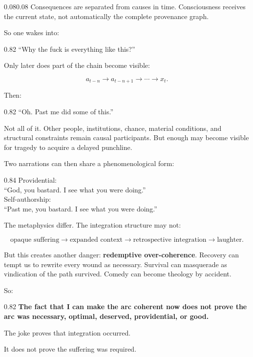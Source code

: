 \documentclass[10pt,letterpaper]{article}
\newenvironment{paperbody}
  {\begin{adjustwidth}{0.08\textwidth}{0.08\textwidth}\justifying}
  {\par\end{adjustwidth}}
\newenvironment{voicebox}
  {\Needspace{3.5\baselineskip}\par\vspace{0.22em}\begin{center}\begingroup
   \begin{lrbox}{\voiceboxsave}\begin{varwidth}{0.82\linewidth}
   \small\rmfamily\upshape\RaggedRight}
  {\end{varwidth}\end{lrbox}\fbox{\usebox{\voiceboxsave}}
   \endgroup\end{center}\vspace{0.22em}}
\newenvironment{dialoguebox}
  {\Needspace{5\baselineskip}\par\vspace{0.26em}\begin{center}\begingroup
   \begin{lrbox}{\dialogueboxsave}\begin{varwidth}{0.84\linewidth}
   \small\rmfamily\upshape\RaggedRight}
  {\end{varwidth}\end{lrbox}\fbox{\usebox{\dialogueboxsave}}
   \endgroup\end{center}\vspace{0.26em}}
\begin{document}
\begin{paperbody}
Consequences are separated from causes in time. Consciousness receives
the current state, not automatically the complete provenance graph.

So one wakes into:

\begin{voicebox}
``Why the fuck is everything like this?''
\end{voicebox}

Only later does part of the chain become visible:

\[
a_{t-n}\to a_{t-n+1}\to\cdots\to x_t.
\]

Then:

\begin{voicebox}
``Oh. Past me did some of this.''
\end{voicebox}

Not all of it. Other people, institutions, chance, material conditions,
and structural constraints remain causal participants. But enough may
become visible for tragedy to acquire a delayed punchline.

Two narrations can then share a phenomenological form:

\begin{dialoguebox}
Providential:\\
``God, you bastard. I see what you were doing.''\\[0.35em]
Self-authorship:\\
``Past me, you bastard. I see what you were doing.''
\end{dialoguebox}

The metaphysics differ. The integration structure may not:

\[
\text{opaque suffering}
\to
\text{expanded context}
\to
\text{retrospective integration}
\to
\text{laughter}.
\]

But this creates another danger: \textbf{redemptive over-coherence}.
Recovery can tempt us to rewrite every wound as necessary. Survival can
masquerade as vindication of the path survived. Comedy can become
theology by accident.

So:

\begin{voicebox}
\textbf{The fact that I can make the arc coherent now does not prove the
arc was necessary, optimal, deserved, providential, or good.}
\end{voicebox}

The joke proves that integration occurred.

It does not prove the suffering was required.


\end{paperbody}
\end{document}

